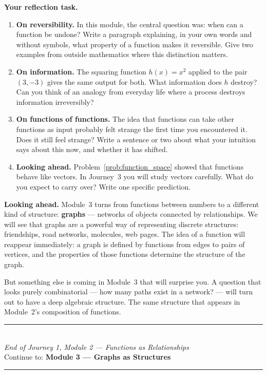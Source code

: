 \documentclass[12pt, a4paper]{article}
\begin{document}
\begin{reflectionbox}
\textbf{Your reflection task.}

\begin{enumerate}
  \item \textbf{On reversibility.} In this module, the central question was: when can a function be undone? Write a paragraph explaining, in your own words and without symbols, what property of a function makes it reversible. Give two examples from outside mathematics where this distinction matters.

  \item \textbf{On information.} The squaring function $h(x) = x^2$ applied to the pair $(3, -3)$ gives the same output for both. What information does $h$ destroy? Can you think of an analogy from everyday life where a process destroys information irreversibly?

  \item \textbf{On functions of functions.} The idea that functions can take other functions as input probably felt strange the first time you encountered it. Does it still feel strange? Write a sentence or two about what your intuition says about this now, and whether it has shifted.

  \item \textbf{Looking ahead.} Problem~\ref{prob:function_space} showed that functions behave like vectors. In Journey~3 you will study vectors carefully. What do you expect to carry over? Write one specific prediction.
\end{enumerate}
\end{reflectionbox}

\medskip
\noindent\textbf{Looking ahead.}
Module~3 turns from functions between numbers to a different kind of structure: \textbf{graphs} --- networks of objects connected by relationships. We will see that graphs are a powerful way of representing discrete structures: friendships, road networks, molecules, web pages. The idea of a function will reappear immediately: a graph is defined by functions from edges to pairs of vertices, and the properties of those functions determine the structure of the graph.

\medskip
But something else is coming in Module~3 that will surprise you. A question that looks purely combinatorial --- how many paths exist in a network? --- will turn out to have a deep algebraic structure. The same structure that appears in Module~2's composition of functions.

\vspace{1.4cm}
\begin{center}
{\color{MidBlue}\rule{0.5\linewidth}{0.8pt}}\\[6pt]
{\small\color{DarkGrey}\textit{End of Journey 1, Module 2 --- Functions as Relationships}}\\[4pt]
{\small\color{DarkGrey}Continue to: \textbf{Module 3 --- Graphs as Structures}}\\[6pt]
{\color{MidBlue}\rule{0.5\linewidth}{0.8pt}}
\end{center}
\end{document}
